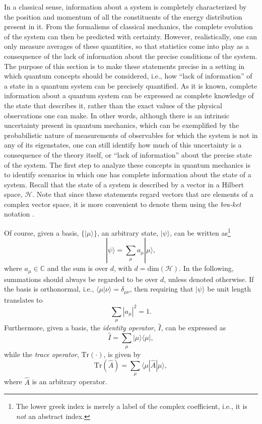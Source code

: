 \documentclass[
12pt,		%
openright,	%
twoside,  %
a4paper,			%
chapter=TITLE,		%
english,			%
french,				%
spanish,			%
brazil				%
]{USPSC-classe/USPSC}
\begin{document}
\begin{apendicesenv}
In a classical sense, information about a system is completely characterized by the position and momentum of all the constituents of the energy distribution present in it. From the formalisms of classical mechanics, the complete evolution of the system can then be predicted with certainty. However, realistically, one can only measure averages of these quantities, so that statistics come into play as a consequence of the lack of information about the precise conditions of the system. The purpose of this section is to make these statements precise in a setting in which quantum concepts should be considered, i.e., how ``lack of information'' of a state in a quantum system can be precisely quantified. As it is known, complete information about a quantum system can be expressed as complete knowledge of the state that describes it, rather than the exact values of the physical observations one can make. In other words, although there is an intrinsic uncertainty present in quantum mechanics, which can be exemplified by the probabilistic nature of measurements of observables for which the system is not in any of its eigenstates, one can still identify how much of this uncertainty is a consequence of the theory itself, or ``lack of information'' about the precise state of the system. The first step to analyze these concepts in quantum mechanics is to identify scenarios in which one has complete information about the state of a system. Recall that the state of a system is described by a vector in a Hilbert space, $\mathscr{H}$. Note that since these statements regard vectors that are elements of a complex vector space, it is more convenient to denote them using the \textit{bra-ket} notation \cite{Sakurai1994}. 

Of course, given a basis, $\{|\mu\rangle\}$, an arbitrary state, $|\psi\rangle$, can be written as\footnote{The lower greek index is merely a label of the complex coefficient, i.e., it is \textit{not} an abstract index.} 
\begin{equation}\label{pure}
    |\psi\rangle=\sum_{\mu}a_{\mu}|{\mu}\rangle,
\end{equation}
where $a_{\mu}\in\mathbb{C}$ and the sum is over $d$, with $d=\text{dim}(\mathscr{H})$. In the following, summations should always be regarded to be over $d$, unless denoted otherwise. If the basis is orthonormal, i.e., $\langle\mu|{\nu}\rangle=\delta_{\mu\nu}$, then requiring that $|\psi\rangle$ be unit length translates to 
\begin{equation}
    \sum_{\mu}|a_{\mu}|^2=1.
\end{equation}
Furthermore, given a basis, the \textit{identity operator}, $\hat{I}$, can be expressed as \cite{Sakurai1994}
\begin{equation}\label{identity}
    \hat{I}=\sum_{\mu}|{\mu}\rangle\langle{\mu}|,
\end{equation}
while the \textit{trace operator}, $\text{Tr}(\cdot)$, is given by
\begin{equation}\label{trace}
    \text{Tr}(\hat{A})=\sum_{\mu}\langle{\mu}|\hat{A}|{\mu}\rangle,
\end{equation}
where $\hat{A}$ is an arbitrary operator. 


\end{apendicesenv}
\end{document}
